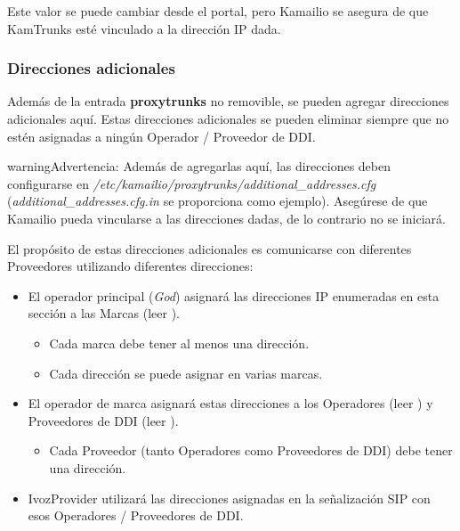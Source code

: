 \documentclass[letterpaper,10pt,spanish]{sphinxmanual}
\begin{document}
Este valor se puede cambiar desde el portal, pero Kamailio se asegura de que KamTrunks esté vinculado a la dirección IP dada.


\subsubsection{Direcciones adicionales}
\label{administration_portal/platform/infrastructure/proxy_trunks:additional-addresses}
Además de la entrada \textbf{proxytrunks} no removible, se pueden agregar direcciones adicionales aquí. Estas direcciones adicionales se pueden eliminar siempre que no estén asignadas a ningún Operador / Proveedor de DDI.

\begin{notice}{warning}{Advertencia:}
Además de agregarlas aquí, las direcciones deben configurarse en \emph{/etc/kamailio/proxytrunks/additional\_addresses.cfg} (\emph{additional\_addresses.cfg.in} se proporciona como ejemplo). Asegúrese de que Kamailio pueda vincularse a las direcciones dadas, de lo contrario no se iniciará.
\end{notice}

El propósito de estas direcciones adicionales es comunicarse con diferentes Proveedores utilizando diferentes direcciones:
\begin{itemize}
\item {} 
El operador principal (\emph{God}) asignará las direcciones IP enumeradas en esta sección a las Marcas (leer {\hyperref[administration_portal/platform/brands:brands]{}}).
\begin{itemize}
\item {} 
Cada marca debe tener al menos una dirección.

\item {} 
Cada dirección se puede asignar en varias marcas.

\end{itemize}

\item {} 
El operador de marca asignará estas direcciones a los Operadores (leer {\hyperref[administration_portal/brand/providers/carriers:carriers]{}}) y Proveedores de DDI (leer {\hyperref[administration_portal/brand/providers/ddi_providers:ddi\string-providers]{}}).
\begin{itemize}
\item {} 
Cada Proveedor (tanto Operadores como Proveedores de DDI) debe tener una dirección.

\end{itemize}

\item {} 
IvozProvider utilizará las direcciones asignadas en la señalización SIP con esos Operadores / Proveedores de DDI.

\end{itemize}
\end{document}
